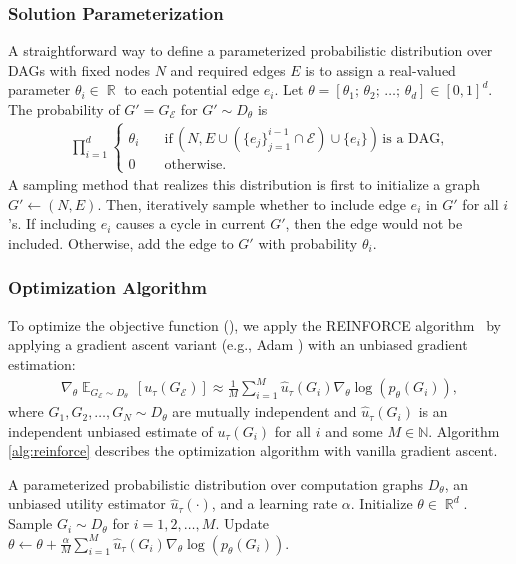 \documentclass{article}
\DeclareMathOperator{\R}{\mathbb{R}}
\DeclareMathOperator{\E}{\mathbb{E}}
\theoremstyle{plain}
\theoremstyle{definition}
\theoremstyle{remark}
\begin{document}
\subsubsection{Solution Parameterization}
A straightforward way to define a parameterized probabilistic distribution over DAGs with fixed nodes $N$ and required edges $E$ is to assign a real-valued parameter $\theta_i \in \R$ to each potential edge $e_i$. Let $\theta = [\theta_1;\, \theta_2;\, \dots;\, \theta_d] \in [0, 1]^d$. The probability of $G' = G_{\mathcal{E}}$ for $G' \sim D_\theta$ is 
\begin{align*}
    \prod_{i=1}^d\begin{cases}
    \theta_i \quad &\text{if}\,
    (N, E\cup(\{e_j\}_{j=1}^{i-1} \cap \mathcal{E}) \cup \{e_i\}) \,\text{is a DAG,}\\
    0 &\text{otherwise.}
    \end{cases}
\end{align*}
A sampling method that realizes this distribution is first to initialize a graph $G' \leftarrow (N, E)$. Then, iteratively sample whether to include edge $e_i$ in $G'$ for all $i$'s. If including $e_i$ causes a cycle in current $G'$, then the edge would not be included. Otherwise, add the edge to $G'$ with probability $\theta_i$.


\subsubsection{Optimization Algorithm}
To optimize the objective function (), we apply the REINFORCE algorithm~\citep{williams1992simple} by applying a gradient ascent variant (e.g., Adam \citep{kingma2014adam}) with an unbiased gradient estimation:
\small
\begin{align}
\nabla_\theta \E_{G_{\mathcal{E}} \sim D_\theta\ }[u_\tau(G_{\mathcal{E}})] \approx \frac{1}{M} \sum_{i=1}^M\hat{u}_\tau(G_i) \nabla_\theta \log(p_\theta(G_i)),
\label{eq:grad}
\end{align}
\normalsize
where $G_1, G_2, \dots, G_N \sim D_\theta$ are mutually independent and $\hat u_\tau(G_i)$ is an independent unbiased estimate of $u_\tau(G_i)$ for all $i$ and some $M \in \mathbb{N}$.
Algorithm \ref{alg:reinforce} describes the optimization algorithm with vanilla gradient ascent.


\begin{algorithm}[h]
\begin{algorithmic}
\REQUIRE A parameterized probabilistic distribution over computation graphs $D_\theta$, an unbiased utility estimator $\hat u_\tau(\cdot)$, and a learning rate $\alpha$.
\STATE Initialize $\theta \in \R^d$.
\STATE Sample $G_i \sim D_\theta$ for $i = 1, 2, \dots, M$.
\STATE Update $\theta \leftarrow \theta + \frac{\alpha}{M} \sum_{i=1}^M\hat{u}_\tau(G_i) \nabla_\theta \log(p_\theta(G_i))$.
\ENDWHILE
\end{algorithmic}
\caption{Edge Optimization with REINFORCE}\label{alg:reinforce}
\end{algorithm}
\end{document}
